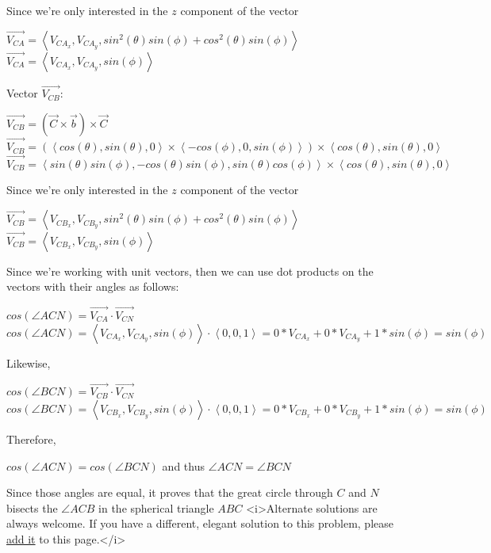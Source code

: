 \begin{enumerate}
 Since we're only interested in the $z$ component of the vector

 $\overrightarrow{V_{CA}}=\left\langle V_{CA_{x}},V_{CA_{y}},sin^{2}(\theta)sin(\phi)+cos^{2}(\theta)sin(\phi) \right\rangle$
$\overrightarrow{V_{CA}}=\left\langle V_{CA_{x}},V_{CA_{y}},sin(\phi) \right\rangle$

 Vector $\overrightarrow{V_{CB}}$:

 $\overrightarrow{V_{CB}}=(\overrightarrow{C}\times\overrightarrow{b})\times\overrightarrow{C}$
$\overrightarrow{V_{CB}}=(\left\langle cos(\theta),sin(\theta),0 \right\rangle\times\left\langle -cos(\phi),0,sin(\phi) \right\rangle)\times \left\langle cos(\theta),sin(\theta),0 \right\rangle$
$\overrightarrow{V_{CB}}=\left\langle sin(\theta)sin(\phi),-cos(\theta)sin(\phi),sin(\theta)cos(\phi) \right\rangle\times \left\langle cos(\theta),sin(\theta),0 \right\rangle$

 Since we're only interested in the $z$ component of the vector

 $\overrightarrow{V_{CB}}=\left\langle V_{CB_{x}},V_{CB_{y}},sin^{2}(\theta)sin(\phi)+cos^{2}(\theta)sin(\phi) \right\rangle$
$\overrightarrow{V_{CB}}=\left\langle V_{CB_{x}},V_{CB_{y}},sin(\phi) \right\rangle$

 Since we're working with unit vectors, then we can use dot products on the vectors with their angles as follows:

 $cos(\angle ACN) = \overrightarrow{V_{CA}}\cdot \overrightarrow{V_{CN}}$
$cos(\angle ACN) = \left\langle V_{CA_{x}},V_{CA_{y}},sin(\phi) \right\rangle \cdot \left\langle 0,0,1 \right\rangle = 0*V_{CA_{x}}+0*V_{CA_{y}}+1*sin(\phi)=sin(\phi)$

 Likewise,

 $cos(\angle BCN) = \overrightarrow{V_{CB}}\cdot \overrightarrow{V_{CN}}$
$cos(\angle BCN) = \left\langle V_{CB_{x}},V_{CB_{y}},sin(\phi) \right\rangle \cdot \left\langle 0,0,1 \right\rangle = 0*V_{CB_{x}}+0*V_{CB_{y}}+1*sin(\phi)=sin(\phi)$

 Therefore,

 $cos(\angle ACN) = cos(\angle BCN)$ and thus $\angle ACN = \angle BCN$

 Since those angles are equal, it proves that the great circle through $C$ and $N$ bisects the $\angle ACB$ in the spherical triangle $ABC$
<i>Alternate solutions are always welcome. If you have a different, elegant solution to this problem, please \href{https://artofproblemsolving.com/wiki/index.php?title=1979\_USAMO\_Problems/Problem\_2&action=edit}{add it} to this page.</i>




\end{enumerate}
